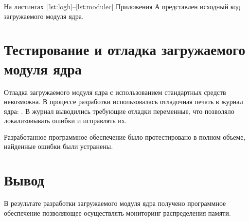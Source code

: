 На листингах~\ref{lst:logh}--\ref{lst:modulec} Приложения А представлен исходный код загружаемого модуля ядра.

\section{Тестирование и отладка загружаемого модуля ядра}

Отладка загружаемого модуля ядра с использованием стандартных средств невозможна. В процессе разработки использовалась отладочная печать в журнал ядра: . В журнал выводились требующие отладки переменные, что позволяло локализовывать ошибки и исправлять их.

Разработанное программное обеспечение было протестировано в полном объеме, найденные ошибки были устранены.

\section{Вывод}

В результате разработки загружаемого модуля ядра получено программное обеспечение позволяющее осуществлять мониторинг распределения памяти.